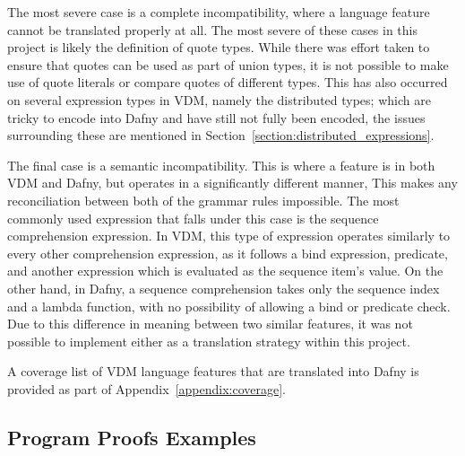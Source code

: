 \documentclass{entcs}
\newcommand{\lfcomment}[1]{\ifthenelse { \boolean{showComments} } {\textcolor{red}{LF:~#1}} { } } %
\begin{document}
The most severe case is a complete incompatibility, where a language feature cannot be translated properly at all. The most severe of these cases in this project is likely the definition of quote types. While there was effort taken to ensure that quotes can be used as part of union types, it is not possible to make use of quote literals or compare quotes of different types. This has also occurred on several expression types in VDM, namely the distributed types; which are tricky to encode into Dafny and have still not fully been encoded, the issues surrounding these are mentioned in Section~\ref{section:distributed_expressions}.

The final case is a semantic incompatibility. This is where a feature is in both VDM and Dafny, but operates in a significantly different manner, This makes any reconciliation between both of the grammar rules impossible. The most commonly used expression that falls under this case is the sequence comprehension expression. In VDM, this type of expression operates similarly to every other comprehension expression, as it follows a bind expression, predicate, and another expression which is evaluated as the sequence item's value. On the other hand, in Dafny, a sequence comprehension takes only the sequence index and a lambda function, with no possibility of allowing a bind or predicate check. Due to this difference in meaning between two similar features, it was not possible to implement either as a translation strategy within this project.

A coverage list of VDM language features that are translated into Dafny is provided as part of Appendix~\ref{appendix:coverage}.

\subsection{Program Proofs Examples}\label{section:program_proof_example_translations}

\end{document}
